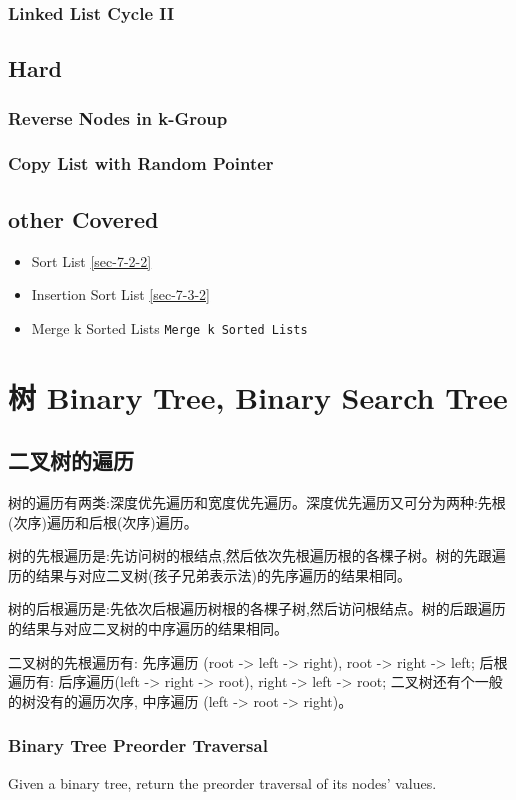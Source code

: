 \documentclass[12pt]{book}
\begin{document}
\subsection{Linked List Cycle II}
\label{sec-3-2-10}
\section{Hard}
\label{sec-3-3}
\subsection{Reverse Nodes in k-Group}
\label{sec-3-3-1}
\subsection{Copy List with Random Pointer}
\label{sec-3-3-2}
\section{other Covered}
\label{sec-3-4}
\begin{itemize}
\item Sort List
\ref{sec-7-2-2}
\item Insertion Sort List
\ref{sec-7-3-2}
\item Merge k Sorted Lists
\texttt{Merge k Sorted Lists}
\end{itemize}
\chapter{树 Binary Tree, Binary Search Tree}
\label{sec-4}
\section{二叉树的遍历}
\label{sec-4-1}

树的遍历有两类:深度优先遍历和宽度优先遍历。深度优先遍历又可分为两种:先根(次序)遍历和后根(次序)遍历。

树的先根遍历是:先访问树的根结点,然后依次先根遍历根的各棵子树。树的先跟遍历的结果与对应二叉树(孩子兄弟表示法)的先序遍历的结果相同。

树的后根遍历是:先依次后根遍历树根的各棵子树,然后访问根结点。树的后跟遍历的结果与对应二叉树的中序遍历的结果相同。

二叉树的先根遍历有: 先序遍历 (root -> left -> right), root -> right -> left; 后根遍历有: 后序遍历(left -> right -> root), right -> left -> root; 二叉树还有个一般的树没有的遍历次序, 中序遍历 (left -> root -> right)。

\subsection{Binary Tree Preorder Traversal}
\label{sec-4-1-1}
Given a binary tree, return the preorder traversal of its nodes' values.
\end{document}
